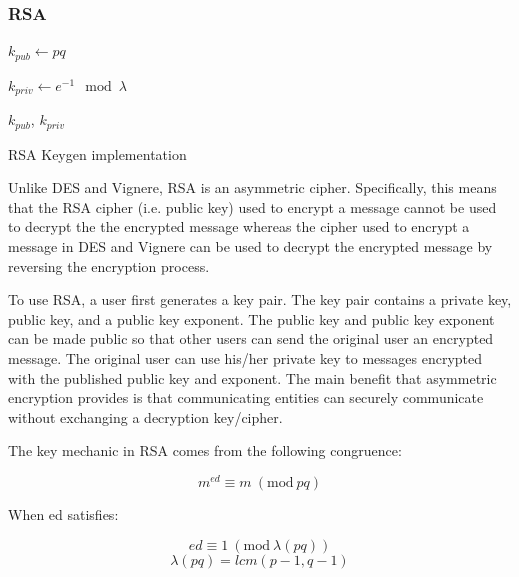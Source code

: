 \documentclass[acmlarge]{acmart}
\newcommand{\Mod}[1]{\ (\mathrm{mod}\ #1)}
\begin{document}
\subsubsection{RSA}
\begin{algorithm}[tbh]
\label{rsa_algo}
\SetAlgoNoLine
{}


$k_{pub} \longleftarrow pq$

$k_{priv} \longleftarrow e^{-1} \mod{\lambda}$

\KwRet $k_{pub}$, $k_{priv}$
\caption{RSA Keygen implementation}
\label{alg:rsa-keygen}
\end{algorithm}

Unlike DES and Vignere, RSA is an asymmetric cipher. Specifically, this means that the RSA cipher (i.e. public key) used to encrypt a message cannot be used to decrypt the the encrypted message whereas the cipher used to encrypt a message in DES and Vignere can be used to decrypt the encrypted message by reversing the encryption process.
		
To use RSA, a user first generates a key pair. The key pair contains a private key, public key, and a public key exponent. The public key and public key exponent can be made public so that other users can send the original user an encrypted message. The original user can use his/her private key to messages encrypted with the published public key and exponent. The main benefit that asymmetric encryption provides is that communicating entities can securely communicate without exchanging a decryption key/cipher.

The key mechanic in RSA comes from the following congruence:

\begin{equation}
\label{rsa_mechanic}
	m^{ed} \equiv m \Mod{pq}
\end{equation}

When ed satisfies:

\begin{equation}
\label{ed_equiv}
	ed \equiv 1 \Mod{\lambda(pq)}
\end{equation}
\begin{equation}
\label{carmichael}
	\lambda(pq) = lcm(p - 1, q - 1)
\end{equation}
\end{document}
